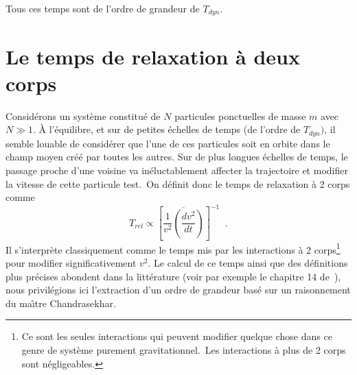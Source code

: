 Tous ces temps sont de l'ordre de grandeur de $T_{dyn}$.

\section{Le temps de relaxation \`{a} deux corps }

Consid\'{e}rons un syst\`{e}me constitu\'{e} de $N$ particules ponctuelles de
masse $m$ avec $N\gg1$. \`{A} l'\'{e}quilibre, et sur de petites \'{e}chelles
de temps (de l'ordre de $T_{dyn})$, il semble louable de consid\'{e}rer que
l'une de ces particules soit en orbite dans le champ moyen cr\'{e}\'{e} par
toutes les autres. Sur de plus longues \'{e}chelles de temps, le passage
proche d'une voisine va in\'{e}luctablement affecter la trajectoire et
modifier la vitesse de cette particule test.\ On d\'{e}finit donc le temps de
relaxation \`{a} 2 corps comme
\begin{equation}
T_{rel}\propto\left[  \overline{\frac{1}{v^{2}}\left(  \frac{dv^{2}}%
{dt}\right)  }\right]  ^{-1}\;\;. \label{TREL}%
\end{equation}
Il s'interpr\`{e}te classiquement comme le temps mis par les interactions
\`{a} 2 corps\footnote{Ce sont les seules interactions qui peuvent modifier
quelque chose dans ce genre de syst\`{e}me purement gravitationnel.\ Les
interactions \`{a} plus de 2 corps sont n\'{e}gligeables.} pour modifier
significativement $v^{2}$. Le calcul de ce temps ainsi que des d\'{e}finitions
plus pr\'{e}cises abondent dans la litt\'{e}rature (voir par exemple le
chapitre 14 de\ \cite{HH}), nous privil\'{e}gions ici l'extraction d'un ordre
de grandeur bas\'{e} sur un raisonnement du ma\^{\i}tre Chandrasekhar.

